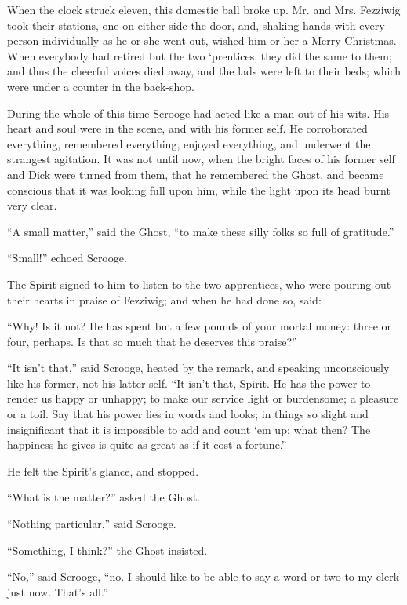 \documentclass[paper=a5,BCOR=15mm,twoside,DIV=15,headinclude=off,12pt,chapterprefix=off,openany,headings=huge]{scrbook} %
\begin{document}
When the clock struck eleven, this domestic ball broke up. Mr. and Mrs. Fezziwig took their stations, one on either side the door, and, shaking hands with every person individually as he or she went out, wished him or her a Merry Christmas. When everybody had retired but the two `prentices, they did the same to them; and thus the cheerful voices died away, and the lads were left to their beds; which were under a counter in the back-shop.

During the whole of this time Scrooge had acted like a man out of his wits. His heart and soul were in the scene, and with his former self. He corroborated everything, remembered everything, enjoyed everything, and underwent the strangest agitation. It was not until now, when the bright faces of his former self and Dick were turned from them, that he remembered the Ghost, and became conscious that it was looking full upon him, while the light upon its head burnt very clear.

\enquote{A small matter,} said the Ghost, \enquote{to make these silly folks so full of gratitude.}

\enquote{Small!} echoed Scrooge.

The Spirit signed to him to listen to the two apprentices, who were pouring out their hearts in praise of Fezziwig; and when he had done so, said:

\enquote{Why! Is it not? He has spent but a few pounds of your mortal money: three or four, perhaps. Is that so much that he deserves this praise?}

\enquote{It isn't that,} said Scrooge, heated by the remark, and speaking unconsciously like his former, not his latter self. \enquote{It isn't that, Spirit. He has the power to render us happy or unhappy; to make our service light or burdensome; a pleasure or a toil. Say that his power lies in words and looks; in things so slight and insignificant that it is impossible to add and count `em up: what then? The happiness he gives is quite as great as if it cost a fortune.}

He felt the Spirit's glance, and stopped.

\enquote{What is the matter?} asked the Ghost.

\enquote{Nothing particular,} said Scrooge.

\enquote{Something, I think?} the Ghost insisted.

\enquote{No,} said Scrooge, \enquote{no. I should like to be able to say a word or two to my clerk just now. That's all.}
\end{document}

